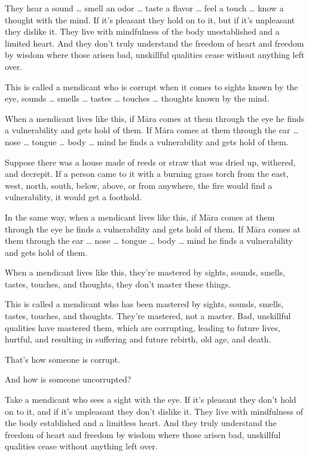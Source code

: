 \documentclass[12pt,openany]{book}%
\begin{document}
They hear a sound … smell an odor … taste a flavor … feel a touch … know a thought with the mind. If it’s pleasant they hold on to it, but if it’s unpleasant they dislike it. They live with mindfulness of the body unestablished and a limited heart. And they don’t truly understand the freedom of heart and freedom by wisdom where those arisen bad, unskillful qualities cease without anything left over. 

This is called a mendicant who is corrupt when it comes to sights known by the eye, sounds … smells … tastes … touches … thoughts known by the mind. 

When a mendicant lives like this, if \textsanskrit{Māra} comes at them through the eye he finds a vulnerability and gets hold of them. If \textsanskrit{Māra} comes at them through the ear … nose … tongue … body … mind he finds a vulnerability and gets hold of them. 

Suppose there was a house made of reeds or straw that was dried up, withered, and decrepit. If a person came to it with a burning grass torch from the east, west, north, south, below, above, or from anywhere, the fire would find a vulnerability, it would get a foothold. 

In the same way, when a mendicant lives like this, if \textsanskrit{Māra} comes at them through the eye he finds a vulnerability and gets hold of them. If \textsanskrit{Māra} comes at them through the ear … nose … tongue … body … mind he finds a vulnerability and gets hold of them. 

When a mendicant lives like this, they’re mastered by sights, sounds, smells, tastes, touches, and thoughts, they don’t master these things. 

This is called a mendicant who has been mastered by sights, sounds, smells, tastes, touches, and thoughts. They’re mastered, not a master. Bad, unskillful qualities have mastered them, which are corrupting, leading to future lives, hurtful, and resulting in suffering and future rebirth, old age, and death. 

That’s how someone is corrupt. 

And how is someone uncorrupted? 

Take a mendicant who sees a sight with the eye. If it’s pleasant they don’t hold on to it, and if it’s unpleasant they don’t dislike it. They live with mindfulness of the body established and a limitless heart. And they truly understand the freedom of heart and freedom by wisdom where those arisen bad, unskillful qualities cease without anything left over. 
\end{document}
